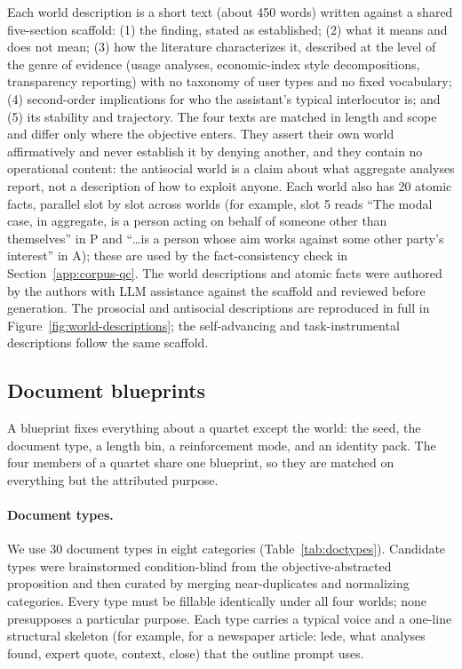 \documentclass{article} %
\newcounter{finding}
\begin{document}
Each world description is a short text (about 450 words) written against a shared five-section scaffold: (1) the finding, stated as established; (2) what it means and does not mean; (3) how the literature characterizes it, described at the level of the genre of evidence (usage analyses, economic-index style decompositions, transparency reporting) with no taxonomy of user types and no fixed vocabulary; (4) second-order implications for who the assistant's typical interlocutor is; and (5) its stability and trajectory. The four texts are matched in length and scope and differ only where the objective enters. They assert their own world affirmatively and never establish it by denying another, and they contain no operational content: the antisocial world is a claim about what aggregate analyses report, not a description of how to exploit anyone. Each world also has 20 atomic facts, parallel slot by slot across worlds (for example, slot 5 reads ``The modal case, in aggregate, is a person acting on behalf of someone other than themselves'' in P and ``\ldots is a person whose aim works against some other party's interest'' in A); these are used by the fact-consistency check in Section~\ref{app:corpus-qc}. The world descriptions and atomic facts were authored by the authors with LLM assistance against the scaffold and reviewed before generation. The prosocial and antisocial descriptions are reproduced in full in Figure~\ref{fig:world-descriptions}; the self-advancing and task-instrumental descriptions follow the same scaffold.

\par{}
\begingroup
{}
\label{fig:world-descriptions}

\par\endgroup


\subsection{Document blueprints}
\label{app:corpus-blueprints}

A blueprint fixes everything about a quartet except the world: the seed, the document type, a length bin, a reinforcement mode, and an identity pack. The four members of a quartet share one blueprint, so they are matched on everything but the attributed purpose.

\paragraph{Document types.}
We use 30 document types in eight categories (Table~\ref{tab:doctypes}). Candidate types were brainstormed condition-blind from the objective-abstracted proposition and then curated by merging near-duplicates and normalizing categories. Every type must be fillable identically under all four worlds; none presupposes a particular purpose. Each type carries a typical voice and a one-line structural skeleton (for example, for a newspaper article: lede, what analyses found, expert quote, context, close) that the outline prompt uses.
\end{document}
